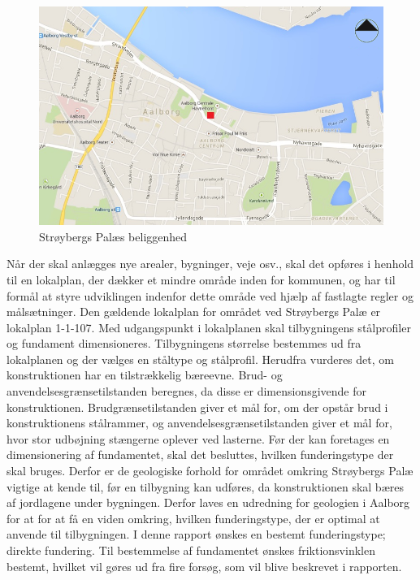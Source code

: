 \begin{figure}[htbp]
	\centering
	\includegraphics[width=1.0\textwidth]{billeder/aalborg.png}
	\caption{Strøybergs Palæs beliggenhed}
	\label{fig:aalborg}
\end{figure}

\indent{     }  Når der skal anlægges nye arealer, bygninger, veje osv., skal det opføres i henhold til en lokalplan, der dækker et mindre område inden for kommunen, og har til formål at styre udviklingen indenfor dette område ved hjælp af fastlagte regler og målsætninger. Den gældende lokalplan for området ved Strøybergs Palæ er lokalplan 1-1-107.
\newline
\newline
Med udgangspunkt i lokalplanen skal tilbygningens stålprofiler og fundament dimensioneres. 
\newline \indent{     }  Tilbygningens størrelse bestemmes ud fra lokalplanen og der vælges en ståltype og stålprofil. Herudfra vurderes det, om konstruktionen har en tilstrækkelig bæreevne. Brud- og anvendelsesgrænsetilstanden beregnes, da disse er dimensionsgivende for konstruktionen. Brudgrænsetilstanden giver et mål for, om der opstår brud i konstruktionens stålrammer, og anvendelsesgrænsetilstanden giver et mål for, hvor stor udbøjning stængerne oplever ved lasterne.
\newline \indent{     }  Før der kan foretages en dimensionering af fundamentet, skal det besluttes, hvilken funderingstype der skal bruges. Derfor er de geologiske forhold for området omkring Strøybergs Palæ vigtige at kende til, før en tilbygning kan udføres, da konstruktionen skal bæres af jordlagene under bygningen. Derfor laves en udredning for geologien i Aalborg for at for at få en viden omkring, hvilken funderingstype, der er optimal at anvende til tilbygningen. I denne rapport ønskes en bestemt funderingstype; direkte fundering. Til bestemmelse af fundamentet ønskes friktionsvinklen bestemt, hvilket vil gøres ud fra fire forsøg, som vil blive beskrevet i rapporten.